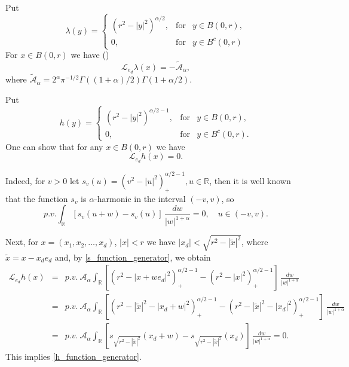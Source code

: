 \documentclass[a4paper,12pt,reqno]{amsart}
\theoremstyle{definition}
\theoremstyle{remark}
\newcommand{\calA}{\mathcal{A}}
\newcommand{\Aa}{\mathcal{A}_{\alpha}}
\newcommand{\calL}{\mathcal{L}}
\newcommand{\R}{\mathds{R}}
\begin{document}
Put
\begin{equation}
\label{lambda_formula}
\lambda(y)= \left\{              
\begin{array}{lll}                   
(r^2 - |y|^2)^{\alpha/2},&\text{for}& y \in B(0,r), \\  
0,&\text{for}& y \in B^c(0,r)
\end{array}       
\right. 
\end{equation}
For $x \in B(0,r)$ we have (\cite{R2025})
\begin{equation}
\label{lambda_formula_generator}
\calL_{e_d} \lambda(x) = -\tilde{\calA}_{\alpha},
\end{equation}
where $\tilde{\calA}_{\alpha}= 2^{\alpha} \pi^{-1/2} \Gamma((1+\alpha)/2) \Gamma(1+\alpha/2)$.

Put
\begin{equation}
\label{h_function}
h(y) =  \left\{              
\begin{array}{lll}                   
(r^2 - |y|^2)^{\alpha/2 - 1},&\text{for}& y \in B(0,r), \\  
0,&\text{for}& y \in B^c(0,r).
\end{array}
\right. 
\end{equation}
One can show that for any $x \in B(0,r)$ we have
\begin{equation}
\label{h_function_generator}
\calL_{e_d} h(x) = 0.
\end{equation}

Indeed, for $v>0$ let $s_v(u)= (v^2-|u|^2)^{\alpha/2-1}_+, u\in \R$, then it is well known that the function $s_v$ is $\alpha$-harmonic 
in the interval  $(-v,v)$, so 
\begin{equation}
\label{s_function_generator}
p.v.\int_{\R} \left[s_v(u +  w) - s_v(u)\right] \, \frac{dw}{|w|^{1 + \alpha}}= 0, \quad u\in  (-v,v).
\end{equation}
		
	Next, for $x=(x_1, x_2, \dots, x_d)$, $|x|<r	$ we have $|x_d|< \sqrt{r^2-|\tilde{ x}|^2}$, where $\tilde{ x}=x-x_de_d$ and, by \eqref{s_function_generator}, we obtain
		\begin{eqnarray}
\calL_{e_d} h(x)&=&p.v.\ {\Aa}\int_{\R} \left[(r^2-|x +  we_d|^2)^{\alpha/2-1}_+ - (r^2-|x|^2)^{\alpha/2-1}_+\right] \, \frac{dw}{|w|^{1 + \alpha}}\nonumber\\
&=&p.v.\ {\Aa}\int_{\R} \left[(r^2-|\tilde{ x}|^2-|x_d +  w|^2)^{\alpha/2-1}_+ - (r^2-|\tilde{ x}|^2-|x_d|^2)^{\alpha/2-1}_+\right] \, \frac{dw}{|w|^{1 + \alpha}}\nonumber\\
&=&p.v.\ {\Aa}\int_{\R} \left[s_{\sqrt{r^2-|\tilde{ x}|^2}}(x_d +  w) - s_{\sqrt{r^2-|\tilde{ x}|^2}}(x_d)
\right] \, \frac{dw}{|w|^{1 + \alpha}}= 0.\nonumber\end{eqnarray}
This implies \eqref{h_function_generator}.
 
\end{document}
